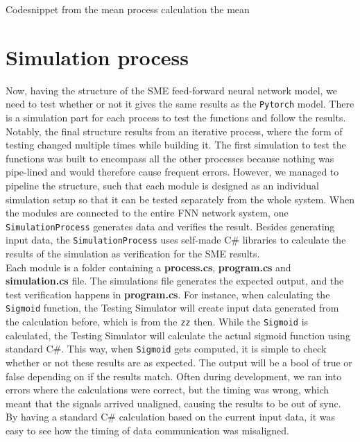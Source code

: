 \begin{listing}
  \inputminted{csharp}{codesnippets/mean_after.cs}
  \caption{Codesnippet from the mean process calculation the mean}
  \label{lst:mean_after}
\end{listing}
\fi


\section{Simulation process}
\label{sec:simulation}

Now, having the structure of the SME feed-forward neural network model, we need to test whether or not it gives the same results as the \texttt{Pytorch} model.
There is a simulation part for each process to test the functions and follow the results. Notably, the final structure results from an iterative process, where the form of testing changed multiple times while building it.
The first simulation to test the functions was built to encompass all the other processes because nothing was pipe-lined and would therefore cause frequent errors. However, we managed to pipeline the structure, such that each module is designed as an individual simulation setup so that it can be tested separately from the whole system. When the modules are connected to the entire FNN network system, one \texttt{SimulationProcess} generates data and verifies the result.
Besides generating input data, the \texttt{SimulationProcess} uses self-made C\# libraries to calculate the results of the simulation as verification for the SME results. \\

Each module is a folder containing a \textbf{process.cs}, \textbf{program.cs} and \textbf{simulation.cs} file. The simulations file generates the expected output, and the test verification happens in \textbf{program.cs}. For instance, when calculating the \texttt{Sigmoid} function, the Testing Simulator will create input data generated from the calculation before, which is from the \texttt{zz} then. While the \texttt{Sigmoid} is calculated, the Testing Simulator will calculate the actual sigmoid function using standard C\#. This way, when \texttt{Sigmoid} gets computed, it is simple to check whether or not these results are as expected. The output will be a bool of true or false depending on if the results match. Often during development, we ran into errors where the calculations were correct, but the timing was wrong, which meant that the signals arrived unaligned, causing the results to be out of sync. By having a standard C\# calculation based on the current input data, it was easy to see how the timing of data communication was misaligned.

